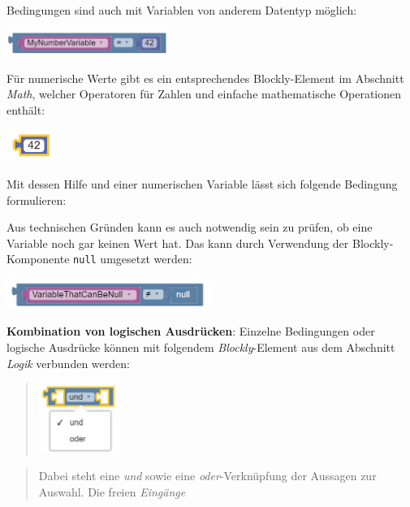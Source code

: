 \documentclass[
  letterpaper,
  DIV=11]{scrreprt}
\begin{document}
\begin{tcolorbox}
Bedingungen sind auch mit Variablen von anderem Datentyp möglich:

\includegraphics[width=2.08333in,height=\textheight]{img/screenshot-blockly-condition-separat-02-DEU.png}

Für numerische Werte gibt es ein entsprechendes Blockly-Element im
Abschnitt \emph{Math}, welcher Operatoren für Zahlen und einfache
mathematische Operationen enthält:

\includegraphics[width=0.625in,height=\textheight]{img/screenshot-routing-block-numeric-value-example42.png}

Mit dessen Hilfe und einer numerischen Variable lässt sich folgende
Bedingung formulieren:

Aus technischen Gründen kann es auch notwendig sein zu prüfen, ob eine
Variable noch gar keinen Wert hat. Das kann durch Verwendung der
Blockly-Komponente \texttt{null} umgesetzt werden:

\includegraphics[width=2.60417in,height=\textheight]{img/screenshot-routing-block-condition-variable-not-null-example-ENG.png}

\textbf{Kombination von logischen Ausdrücken}: Einzelne Bedingungen oder
logische Ausdrücke können mit folgendem \emph{Blockly}-Element aus dem
Abschnitt \emph{Logik} verbunden werden:

\begin{quote}
\includegraphics[width=1.04167in,height=\textheight]{img/screenshot-blockly-element-logic-combine-01-DEU.png}
\end{quote}

\begin{quote}
Dabei steht eine \emph{und} sowie eine \emph{oder}-Verknüpfung der
Aussagen zur Auswahl. Die freien \emph{Eingänge}
\end{quote}


\end{tcolorbox}
\end{document}
